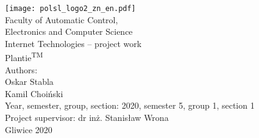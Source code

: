 
\thispagestyle{empty}

\begin{titlepage}
{\centering
{}
\null
\vspace{-1.0in}
\texttt{[image: polsl\_logo2\_zn\_en.pdf]}\\[2.5em]
\normalfont\LARGE
Faculty of Automatic Control, \\Electronics and Computer Science \\[1.3em]
\normalfont\LARGE
Internet Technologies -- project work \\[1.5em]
\UseLMSSBoldFont\LARGE
Plantie\textsuperscript{TM}\\[5.2em]}
\normalfont\large
\noindent
Authors: 
\\[0.5em]
Oskar Stabla\\
Kamil Choiński
\\[1.5em]
Year, semester, group, section: 2020, semester 5, group 1, section 1
\\[0.5em]
Project supervisor: dr inż. Stanisław Wrona
\\[1.5em]

\vfill
\centering Gliwice 2020
\par
\end{titlepage}




\pagestyle{plain}
\setcounter{page}{2}


\clearpage




\tableofcontents



\clearpage
